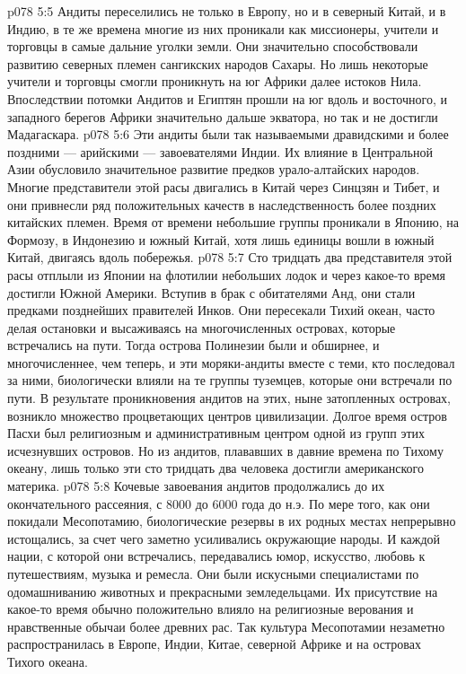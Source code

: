 \vs p078 5:5 \pc Андиты переселились не только в Европу, но и в северный Китай, и в Индию, в те же времена многие из них проникали как миссионеры, учители и торговцы в самые дальние уголки земли. Они значительно способствовали развитию северных племен сангикских народов Сахары. Но лишь некоторые учители и торговцы смогли проникнуть на юг Африки далее истоков Нила. Впоследствии потомки Андитов и Египтян прошли на юг вдоль и восточного, и западного берегов Африки значительно дальше экватора, но так и не достигли Мадагаскара.
\vs p078 5:6 Эти андиты были так называемыми дравидскими и более поздними --- арийскими --- завоевателями Индии. Их влияние в Центральной Азии обусловило значительное развитие предков урало\hyp{}алтайских народов. Многие представители этой расы двигались в Китай через Синцзян и Тибет, и они привнесли ряд положительных качеств в наследственность более поздних китайских племен. Время от времени небольшие группы проникали в Японию, на Формозу, в Индонезию и южный Китай, хотя лишь единицы вошли в южный Китай, двигаясь вдоль побережья.
\vs p078 5:7 Сто тридцать два представителя этой расы отплыли из Японии на флотилии небольших лодок и через какое\hyp{}то время достигли Южной Америки. Вступив в брак с обитателями Анд, они стали предками позднейших правителей Инков. Они пересекали Тихий океан, часто делая остановки и высаживаясь на многочисленных островах, которые встречались на пути. Тогда острова Полинезии были и обширнее, и многочисленнее, чем теперь, и эти моряки\hyp{}андиты вместе с теми, кто последовал за ними, биологически влияли на те группы туземцев, которые они встречали по пути. В результате проникновения андитов на этих, ныне затопленных островах, возникло множество процветающих центров цивилизации. Долгое время остров Пасхи был религиозным и административным центром одной из групп этих исчезнувших островов. Но из андитов, плававших в давние времена по Тихому океану, лишь только эти сто тридцать два человека достигли американского материка.
\vs p078 5:8 \pc Кочевые завоевания андитов продолжались до их окончательного рассеяния, с 8000 до 6000 года до н.э. По мере того, как они покидали Месопотамию, биологические резервы в их родных местах непрерывно истощались, за счет чего заметно усиливались окружающие народы. И каждой нации, с которой они встречались, передавались юмор, искусство, любовь к путешествиям, музыка и ремесла. Они были искусными специалистами по одомашниванию животных и прекрасными земледельцами. Их присутствие на какое\hyp{}то время обычно положительно влияло на религиозные верования и нравственные обычаи более древних рас. Так культура Месопотамии незаметно распространилась в Европе, Индии, Китае, северной Африке и на островах Тихого океана.
